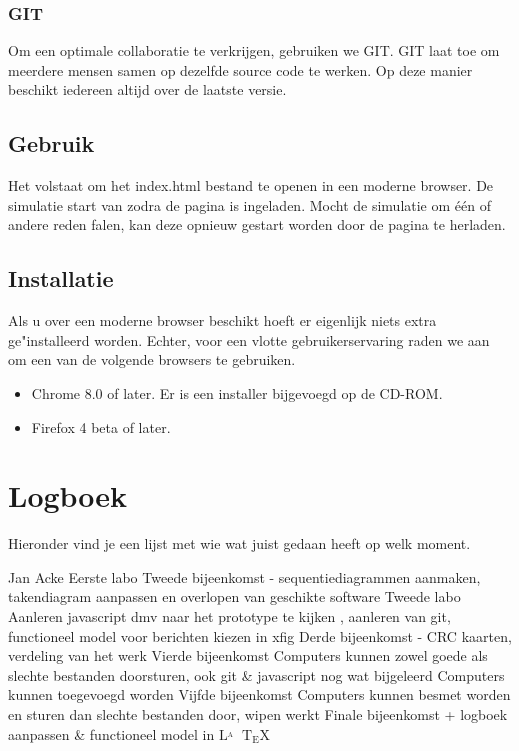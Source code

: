 \documentclass[a4paper,oneside]{report}
\def\latex{$\mathrm{L\!\!^{{}_{\scriptstyle A}} \!\!\!\!\!\;\; T\!_{\displaystyle E} \!
X}$}
\begin{document}
\subsection{GIT}
Om een optimale collaboratie te verkrijgen, gebruiken we GIT.
GIT laat toe om meerdere mensen samen op dezelfde source code te werken.
Op deze manier beschikt iedereen altijd over de laatste versie.

\section{Gebruik}
Het volstaat om het index.html bestand te openen in een moderne browser. De simulatie start van zodra de pagina is ingeladen.
Mocht de simulatie om \'{e}\'{e}n of andere reden falen, kan deze opnieuw gestart worden door de pagina te herladen.
\section{Installatie}
Als u over een moderne browser beschikt hoeft er eigenlijk niets extra ge"installeerd worden.
Echter, voor een vlotte gebruikerservaring raden we aan om een van de volgende browsers te gebruiken.
\begin{itemize}
\item Chrome 8.0 of later. Er is een installer bijgevoegd op de CD-ROM.
\item Firefox 4 beta of later.
\end{itemize}


\chapter{Logboek}
Hieronder vind je een lijst met wie wat juist gedaan heeft op welk moment.
\begin{studentlog}{Jan Acke}
{Eerste labo}
{Tweede bijeenkomst - sequentiediagrammen aanmaken, takendiagram aanpassen en overlopen van geschikte software}
{Tweede labo}
{Aanleren javascript dmv naar het prototype te kijken , aanleren van git, functioneel model voor berichten kiezen in xfig}
{Derde bijeenkomst - CRC kaarten, verdeling van het werk}
{Vierde bijeenkomst}
{Computers kunnen zowel goede als slechte bestanden doorsturen, ook git \& javascript nog wat bijgeleerd}
{Computers kunnen toegevoegd worden}
{Vijfde bijeenkomst}
{Computers kunnen besmet worden en sturen dan slechte bestanden door, wipen werkt}
{Finale bijeenkomst + logboek aanpassen \& functioneel model in \latex}
\end{studentlog}
\end{document}
